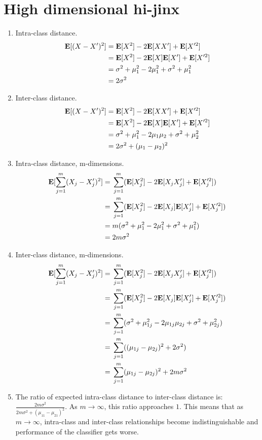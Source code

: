 \section{High dimensional hi-jinx}

\begin{enumerate}
\item Intra-class distance.
  \begin{align*}
    {\mathbf E}[(X - X')^2] =&\; {\mathbf E}[X^2]-2{\mathbf E}[XX']+{\mathbf E}[X'^2] \\
    =&\; {\mathbf E}[X^2]-2{\mathbf E}[X]{\mathbf E}[X']+{\mathbf E}[X'^2] \\
    =&\; \sigma^2+\mu_1^2-2\mu_1^2+\sigma^2+\mu_1^2\\
    =&\; 2\sigma^2
  \end{align*}

\item Inter-class distance.
  \begin{align*}
    {\mathbf E}[(X - X')^2] =&\;  {\mathbf E}[X^2]-2{\mathbf E}[XX']+{\mathbf E}[X'^2] \\
    =&\; {\mathbf E}[X^2]-2{\mathbf E}[X]{\mathbf E}[X']+{\mathbf E}[X'^2] \\
    =&\; \sigma^2+\mu_1^2-2\mu_1\mu_2+\sigma^2+\mu_2^2\\
    =&\; 2\sigma^2+(\mu_1-\mu_2)^2
  \end{align*}

\item Intra-class distance, m-dimensions.
  \begin{align*}
    {\mathbf E}[\sum_{j=1}^m (X_{j} - X'_{j})^2] =&\; \sum_{j=1}^m ({\mathbf E}[X_j^2]-2{\mathbf E}[X_jX'_j]+{\mathbf E}[X'^2_j])\\
    =&\; \sum_{j=1}^m ({\mathbf E}[X_j^2]-2{\mathbf E}[X_j]{\mathbf E}[X'_j]+{\mathbf E}[X'^2_j])\\
    =&\; m(\sigma^2+\mu_1^2-2\mu_1^2+\sigma^2+\mu_1^2)\\
    =&\; 2m\sigma^2
  \end{align*}

\item Inter-class distance, m-dimensions.
  \begin{align*}
    {\mathbf E}[\sum_{j=1}^m (X_{j} - X'_{j})^2] =&\; \sum_{j=1}^m ({\mathbf E}[X_j^2]-2{\mathbf E}[X_jX'_j]+{\mathbf E}[X'^2_j])\\
    =&\; \sum_{j=1}^m ({\mathbf E}[X_j^2]-2{\mathbf E}[X_j]{\mathbf E}[X'_j]+{\mathbf E}[X'^2_j])\\
    =&\; \sum_{j=1}^m (\sigma^2+\mu_{1j}^2-2\mu_{1j}\mu_{2j}+\sigma^2+\mu_{2j}^2)\\
    =&\; \sum_{j=1}^m ((\mu_{1j}-\mu_{2j})^2+2\sigma^2)\\
    =&\; \sum_{j=1}^m (\mu_{1j}-\mu_{2j})^2+2m\sigma^2
  \end{align*}

\item The ratio of expected intra-class distance to inter-class
  distance is: $\frac{2m\sigma^2}{2m\sigma^2+(\mu_{11}-\mu_{21})^2}$.  As $m \to \infty$, this
  ratio approaches $1$. This means that as $m \to \infty$, intra-class and inter-class relationships become indistinguishable and performance of the classifier gets worse.
\end{enumerate}
